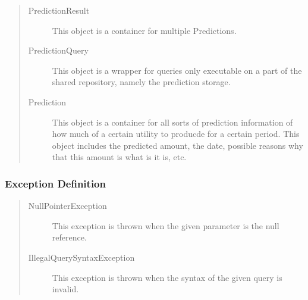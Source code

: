 \begin{quote}
	\begin{description}
		\item[PredictionResult] This object is a container for multiple Predictions.
		\item[PredictionQuery] This object is a wrapper for queries only executable on
		a part of the shared repository, namely the prediction storage.
		\item[Prediction] This object is a container for all sorts of
		prediction information of how much of a certain utility to producde for
		a certain period. This object includes the predicted amount, the date,
		possible reasons why that this amount is what is it is, etc.
	\end{description} 
\end{quote}

\subsubsection{Exception Definition} 

\begin{quote}
	\begin{description}
		\item[NullPointerException] This exception is thrown when the given parameter
		is the null reference.
		\item[IllegalQuerySyntaxException] This exception is thrown when the syntax of
		the given query is invalid.
	\end{description} 
\end{quote}